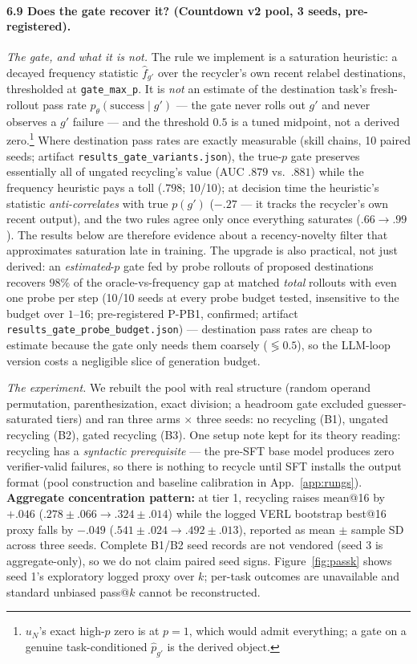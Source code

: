 \paragraph{6.9 Does the gate recover it? (Countdown v2 pool, 3
seeds, pre-registered).}
\emph{The gate, and what it is not.} The rule we implement is a
saturation heuristic: a decayed frequency statistic $\hat f_{g'}$ over
the recycler's own recent relabel destinations, thresholded at
\texttt{gate\_max\_p}. It is \emph{not} an estimate of the destination
task's fresh-rollout pass rate $p_\theta(\text{success} \mid g')$ ---
the gate never rolls out $g'$ and never observes a $g'$ failure ---
and the threshold $0.5$ is a tuned midpoint, not a derived
zero.\footnote{$u_N$'s exact high-$p$ zero is at $p{=}1$, which would
admit everything; a gate on a genuine task-conditioned $\hat p_{g'}$
is the derived object.} Where destination pass rates are exactly
measurable (skill chains, 10 paired seeds; artifact
\texttt{results\_gate\_variants.json}), the true-$p$ gate preserves
essentially all of ungated recycling's value (AUC $.879$ vs.\ $.881$)
while the frequency heuristic pays a toll ($.798$; 10/10); at decision
time the heuristic's statistic \emph{anti-correlates} with true
$p(g')$ ($-.27$ --- it tracks the recycler's own recent output), and
the two rules agree only once everything saturates ($.66 \to .99$).
The results below are therefore evidence about a recency-novelty
filter that approximates saturation late in training. The upgrade is
also practical, not just derived: an \emph{estimated}-$p$ gate fed by
probe rollouts of proposed destinations recovers $98\%$ of the
oracle-vs-frequency gap at matched \emph{total} rollouts with even
one probe per step (10/10 seeds at every probe budget tested,
insensitive to the budget over $1$--$16$; pre-registered P-PB1,
confirmed; artifact \texttt{results\_gate\_probe\_budget.json}) --- destination
pass rates are cheap to estimate because the gate only needs them
coarsely ($\lessgtr 0.5$), so the LLM-loop version costs a
negligible slice of generation budget.

\emph{The experiment.} We rebuilt the pool with real structure
(random operand permutation, parenthesization, exact division; a
headroom gate excluded guesser-saturated tiers) and ran three arms
$\times$ three seeds: no recycling (B1), ungated recycling (B2), gated
recycling (B3). One setup note kept for its theory reading: recycling
has a \emph{syntactic prerequisite} --- the pre-SFT base model
produces zero verifier-valid failures, so there is nothing to recycle
until SFT installs the output format (pool construction and baseline
calibration in App.~\ref{app:rungs}). \textbf{Aggregate concentration
pattern:} at tier 1, recycling raises mean@16 by $+.046$
($.278{\pm}.066 \to .324{\pm}.014$) while the logged VERL bootstrap
best@16 proxy falls by $-.049$ ($.541{\pm}.024 \to .492{\pm}.013$),
reported as mean $\pm$ sample SD across three seeds. Complete B1/B2
seed records are not vendored (seed 3 is aggregate-only), so we do not
claim paired seed signs. Figure~\ref{fig:passk} shows seed 1's
exploratory logged proxy over $k$; per-task outcomes are unavailable
and standard unbiased pass@$k$ cannot be reconstructed.

